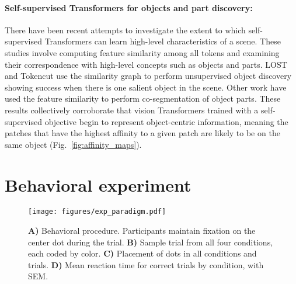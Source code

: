 \documentclass{article}
\begin{document}

\paragraph{Self-supervised Transformers for objects and part discovery:}
There have been recent attempts to investigate the extent to which self-supervised Transformers can learn high-level characteristics of a scene. These studies involve computing feature similarity among all tokens and examining their correspondence with high-level concepts such as objects and parts. LOST \citep{simeoni2021localizing} and Tokencut \citep{wang2022self} use the similarity graph to perform unsupervised object discovery showing success when there is one salient object in the scene. Other work \citep{amir2021deep} have used the feature similarity to perform co-segmentation of object parts. These results collectively corroborate that vision Transformers trained with a self-supervised objective begin to represent object-centric information, meaning the patches that have the highest affinity to a given patch are likely to be on the same object (Fig.~\ref{fig:affinity_maps}).


\section{Behavioral experiment}

\begin{figure}[ht]
\begin{center}
\texttt{[image: figures/exp\_paradigm.pdf]}
\end{center}
\caption{\textbf{A)} Behavioral procedure. Participants maintain fixation on the center dot during the trial. \textbf{B)} Sample trial from all four conditions, each coded by color. \textbf{C)} Placement of dots in all conditions and trials. \textbf{D)} Mean reaction time for correct trials by condition, with SEM.} %
\label{fig:beh_exp}
\end{figure}
\end{document}
